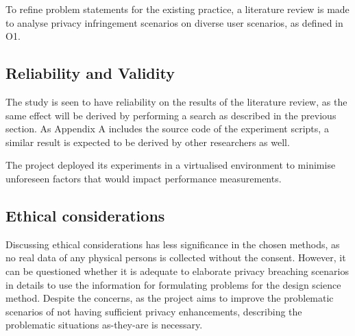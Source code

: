 To refine problem statements for the existing practice, a literature review is made to analyse privacy infringement scenarios on diverse user scenarios, as defined in O1.


\subsection{Reliability and Validity}
The study is seen to have reliability on the results of the literature review, as the same effect will be derived by performing a search as described in the previous section. As Appendix A includes the source code of the experiment scripts, a similar result is expected to be derived by other researchers as well. 

The project deployed its experiments in a virtualised environment to minimise unforeseen factors that would impact performance measurements.

\subsection{Ethical considerations}
Discussing ethical considerations has less significance in the chosen methods, as no real data of any physical persons is collected without the consent.
However, it can be questioned whether it is adequate to elaborate privacy breaching scenarios in details to use the information for formulating problems for the design science method.
Despite the concerns, as the project aims to improve the problematic scenarios of not having sufficient privacy enhancements, describing the problematic situations as-they-are is necessary.